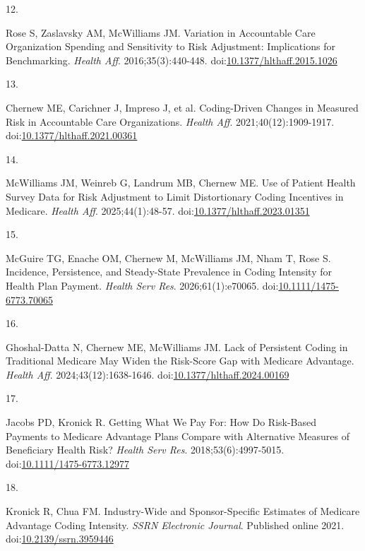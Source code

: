\documentclass[
  12pt,
  number]{elsarticle}
\newlength{\cslhangindent}
\newlength{\csllabelwidth}
\newenvironment{CSLReferences}[2] %
 {\begin{list}{}{%
  \setlength{\itemindent}{0pt}
  \setlength{\leftmargin}{0pt}
  \setlength{\parsep}{0pt}
  \ifodd #1
   \setlength{\leftmargin}{\cslhangindent}
   \setlength{\itemindent}{-1\cslhangindent}
  \fi
  \setlength{\itemsep}{#2\baselineskip}}}
 {\end{list}}
\newcommand{\CSLLeftMargin}[1]{\parbox[t]{\csllabelwidth}{\strut#1\strut}}
\newcommand{\CSLRightInline}[1]{\parbox[t]{\linewidth - \csllabelwidth}{\strut#1\strut}}
\begin{document}
\begin{CSLReferences}{0}{1}
\CSLLeftMargin{12. }%
\CSLRightInline{Rose S, Zaslavsky AM, McWilliams JM. Variation in
Accountable Care Organization Spending and Sensitivity to Risk
Adjustment: Implications for Benchmarking. \emph{Health Aff}.
2016;35(3):440-448.
doi:\href{https://doi.org/10.1377/hlthaff.2015.1026}{10.1377/hlthaff.2015.1026}}

\CSLLeftMargin{13. }%
\CSLRightInline{Chernew ME, Carichner J, Impreso J, et al. Coding-Driven
Changes in Measured Risk in Accountable Care Organizations. \emph{Health
Aff}. 2021;40(12):1909-1917.
doi:\href{https://doi.org/10.1377/hlthaff.2021.00361}{10.1377/hlthaff.2021.00361}}

\CSLLeftMargin{14. }%
\CSLRightInline{McWilliams JM, Weinreb G, Landrum MB, Chernew ME. {Use
of Patient Health Survey Data for Risk Adjustment to Limit Distortionary
Coding Incentives in Medicare}. \emph{Health Aff}. 2025;44(1):48-57.
doi:\href{https://doi.org/10.1377/hlthaff.2023.01351}{10.1377/hlthaff.2023.01351}}

\CSLLeftMargin{15. }%
\CSLRightInline{McGuire TG, Enache OM, Chernew M, McWilliams JM, Nham T,
Rose S. {Incidence, Persistence, and Steady-State Prevalence in Coding
Intensity for Health Plan Payment}. \emph{Health Serv Res}.
2026;61(1):e70065.
doi:\href{https://doi.org/10.1111/1475-6773.70065}{10.1111/1475-6773.70065}}

\CSLLeftMargin{16. }%
\CSLRightInline{Ghoshal-Datta N, Chernew ME, McWilliams JM. {Lack of
Persistent Coding in Traditional Medicare May Widen the Risk-Score Gap
with Medicare Advantage}. \emph{Health Aff}. 2024;43(12):1638-1646.
doi:\href{https://doi.org/10.1377/hlthaff.2024.00169}{10.1377/hlthaff.2024.00169}}

\CSLLeftMargin{17. }%
\CSLRightInline{Jacobs PD, Kronick R. {Getting What We Pay For: How Do
Risk-Based Payments to Medicare Advantage Plans Compare with Alternative
Measures of Beneficiary Health Risk?} \emph{Health Serv Res}.
2018;53(6):4997-5015.
doi:\href{https://doi.org/10.1111/1475-6773.12977}{10.1111/1475-6773.12977}}

\CSLLeftMargin{18. }%
\CSLRightInline{Kronick R, Chua FM. Industry-Wide and Sponsor-Specific
Estimates of Medicare Advantage Coding Intensity. \emph{SSRN Electronic
Journal}. Published online 2021.
doi:\href{https://doi.org/10.2139/ssrn.3959446}{10.2139/ssrn.3959446}}


\end{CSLReferences}
\end{document}
